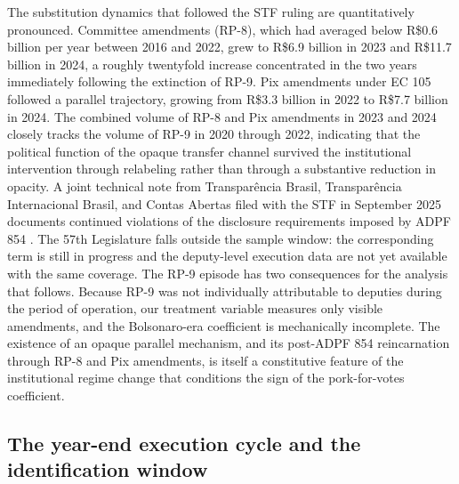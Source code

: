 \documentclass[pdflatex,sn-basic]{sn-jnl}
\begin{document}
The substitution dynamics that followed the STF ruling are quantitatively pronounced. Committee amendments (RP-8), which had averaged below R\$0.6 billion per year between 2016 and 2022, grew to R\$6.9 billion in 2023 and R\$11.7 billion in 2024, a roughly twentyfold increase concentrated in the two years immediately following the extinction of RP-9. Pix amendments under EC 105 followed a parallel trajectory, growing from R\$3.3 billion in 2022 to R\$7.7 billion in 2024. The combined volume of RP-8 and Pix amendments in 2023 and 2024 closely tracks the volume of RP-9 in 2020 through 2022, indicating that the political function of the opaque transfer channel survived the institutional intervention through relabeling rather than through a substantive reduction in opacity. A joint technical note from Transpar\^encia Brasil, Transpar\^encia Internacional Brasil, and Contas Abertas filed with the STF in September 2025 documents continued violations of the disclosure requirements imposed by ADPF 854 \citep{TransparenciaBrasil2025}. The 57th Legislature falls outside the sample window: the corresponding term is still in progress and the deputy-level execution data are not yet available with the same coverage. The RP-9 episode has two consequences for the analysis that follows. Because RP-9 was not individually attributable to deputies during the period of operation, our treatment variable measures only visible amendments, and the Bolsonaro-era coefficient is mechanically incomplete. The existence of an opaque parallel mechanism, and its post-ADPF 854 reincarnation through RP-8 and Pix amendments, is itself a constitutive feature of the institutional regime change that conditions the sign of the pork-for-votes coefficient.

\subsection{The year-end execution cycle and the identification window}
\label{subsec:execution_cycle}
\end{document}
